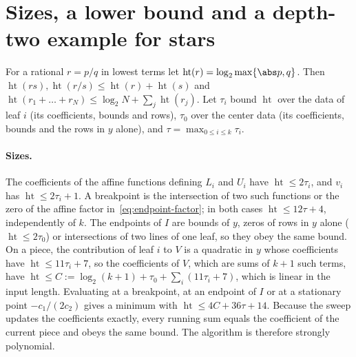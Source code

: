 \section{Sizes, a lower bound and a depth-two example for stars}\label{app:star}

For a rational $r=p/q$ in lowest terms let $\operatorname{ht}(r)=\log_2\max\{\abs p,q\}$.
Then $\operatorname{ht}(rs),\operatorname{ht}(r/s)\le\operatorname{ht}(r)+\operatorname{ht}(s)$
and $\operatorname{ht}(r_1+\dots+r_N)\le\log_2N+\sum_j\operatorname{ht}(r_j)$. Let
$\tau_i$ bound $\operatorname{ht}$ over the data of leaf $i$ (its coefficients,
bounds and rows), $\tau_0$ over the center data (its coefficients, bounds and
the rows in $y$ alone), and $\tau=\max_{0\le i\le k}\tau_i$.

\paragraph{Sizes.}
The coefficients of the affine functions defining $L_i$ and $U_i$ have
$\operatorname{ht}\le2\tau_i$, and $v_i$ has $\operatorname{ht}\le2\tau_i+1$. A
breakpoint is the intersection of two such functions or the zero of the affine
factor in~\eqref{eq:endpoint-factor}; in both cases $\operatorname{ht}\le12\tau+4$,
independently of $k$. The endpoints of $I$ are bounds of $y$, zeros of rows in
$y$ alone ($\operatorname{ht}\le2\tau_0$) or intersections of two lines of one
leaf, so they obey the same bound. On a piece, the contribution of leaf $i$ to
$V$ is a quadratic in $y$ whose coefficients have $\operatorname{ht}\le11\tau_i+7$,
so the coefficients of $V$, which are sums of $k+1$ such terms, have
$\operatorname{ht}\le C:=\log_2(k+1)+\tau_0+\sum_i(11\tau_i+7)$, which is linear in
the input length. Evaluating at a breakpoint, at an endpoint of $I$ or at a
stationary point $-c_1/(2c_2)$ gives a minimum with $\operatorname{ht}\le4C+36\tau+14$.
Because the sweep updates the coefficients exactly, every running sum equals
the coefficient of the current piece and obeys the same bound. The algorithm
is therefore strongly polynomial.

